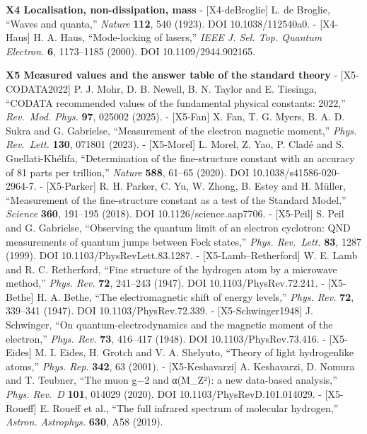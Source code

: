 \documentclass[
  a4paper,
]{article}
\begin{document}
\textbf{X4 Localisation, non-dissipation, mass} - {[}X4-deBroglie{]} L.
de Broglie, ``Waves and quanta,'' \emph{Nature} \textbf{112}, 540
(1923). DOI 10.1038/112540a0. - {[}X4-Haus{]} H. A. Haus, ``Mode-locking
of lasers,'' \emph{IEEE J. Sel. Top. Quantum Electron.} \textbf{6},
1173--1185 (2000). DOI 10.1109/2944.902165.

\textbf{X5 Measured values and the answer table of the standard theory}
- {[}X5-CODATA2022{]} P. J. Mohr, D. B. Newell, B. N. Taylor and E.
Tiesinga, ``CODATA recommended values of the fundamental physical
constants: 2022,'' \emph{Rev.~Mod. Phys.} \textbf{97}, 025002 (2025). -
{[}X5-Fan{]} X. Fan, T. G. Myers, B. A. D. Sukra and G. Gabrielse,
``Measurement of the electron magnetic moment,'' \emph{Phys. Rev.~Lett.}
\textbf{130}, 071801 (2023). - {[}X5-Morel{]} L. Morel, Z. Yao, P. Cladé
and S. Guellati-Khélifa, ``Determination of the fine-structure constant
with an accuracy of 81 parts per trillion,'' \emph{Nature} \textbf{588},
61--65 (2020). DOI 10.1038/s41586-020-2964-7. - {[}X5-Parker{]} R. H.
Parker, C. Yu, W. Zhong, B. Estey and H. Müller, ``Measurement of the
fine-structure constant as a test of the Standard Model,''
\emph{Science} \textbf{360}, 191--195 (2018). DOI
10.1126/science.aap7706. - {[}X5-Peil{]} S. Peil and G. Gabrielse,
``Observing the quantum limit of an electron cyclotron: QND measurements
of quantum jumps between Fock states,'' \emph{Phys. Rev.~Lett.}
\textbf{83}, 1287 (1999). DOI 10.1103/PhysRevLett.83.1287. -
{[}X5-Lamb--Retherford{]} W. E. Lamb and R. C. Retherford, ``Fine
structure of the hydrogen atom by a microwave method,'' \emph{Phys.
Rev.} \textbf{72}, 241--243 (1947). DOI 10.1103/PhysRev.72.241. -
{[}X5-Bethe{]} H. A. Bethe, ``The electromagnetic shift of energy
levels,'' \emph{Phys. Rev.} \textbf{72}, 339--341 (1947). DOI
10.1103/PhysRev.72.339. - {[}X5-Schwinger1948{]} J. Schwinger, ``On
quantum-electrodynamics and the magnetic moment of the electron,''
\emph{Phys. Rev.} \textbf{73}, 416--417 (1948). DOI
10.1103/PhysRev.73.416. - {[}X5-Eides{]} M. I. Eides, H. Grotch and V.
A. Shelyuto, ``Theory of light hydrogenlike atoms,'' \emph{Phys. Rep.}
\textbf{342}, 63 (2001). - {[}X5-Keshavarzi{]} A. Keshavarzi, D. Nomura
and T. Teubner, ``The muon g−2 and α(M\_Z²): a new data-based
analysis,'' \emph{Phys. Rev.~D} \textbf{101}, 014029 (2020). DOI
10.1103/PhysRevD.101.014029. - {[}X5-Roueff{]} E. Roueff et al., ``The
full infrared spectrum of molecular hydrogen,'' \emph{Astron.
Astrophys.} \textbf{630}, A58 (2019).
\end{document}

